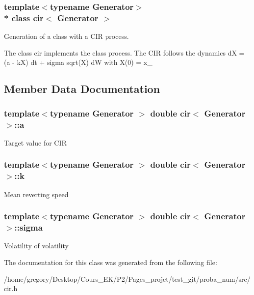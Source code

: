 \subsubsection*{template$<$typename Generator$>$\\*
class cir$<$ Generator $>$}

Generation of a class with a C\+IR process. 

The class cir implements the class process. The C\+IR follows the dynamics dX = (a -\/ kX) dt + sigma sqrt(\+X) dW with X(0) = x\+\_ 

\subsection{Member Data Documentation}
\subsubsection[{\texorpdfstring{a}{a}}]{\setlength{\rightskip}{0pt plus 5cm}template$<$typename Generator $>$ double {\bf cir}$<$ Generator $>$\+::a\hspace{0.3cm}{\ttfamily [protected]}}\hypertarget{classcir_a358578305ea60d31c00546233304651c}{}\label{classcir_a358578305ea60d31c00546233304651c}
Target value for C\+IR 
\subsubsection[{\texorpdfstring{k}{k}}]{\setlength{\rightskip}{0pt plus 5cm}template$<$typename Generator $>$ double {\bf cir}$<$ Generator $>$\+::k\hspace{0.3cm}{\ttfamily [protected]}}\hypertarget{classcir_aa5b05ff03ee8bb587ea94426a9ce704b}{}\label{classcir_aa5b05ff03ee8bb587ea94426a9ce704b}
Mean reverting speed 
\subsubsection[{\texorpdfstring{sigma}{sigma}}]{\setlength{\rightskip}{0pt plus 5cm}template$<$typename Generator $>$ double {\bf cir}$<$ Generator $>$\+::sigma\hspace{0.3cm}{\ttfamily [protected]}}\hypertarget{classcir_a76df757acc0179e1cdf766ed6627efc9}{}\label{classcir_a76df757acc0179e1cdf766ed6627efc9}
Volatility of volatility 

The documentation for this class was generated from the following file\+:\begin{DoxyCompactItemize}
\item 
/home/gregory/\+Desktop/\+Cours\+\_\+\+E\+K/\+P2/\+Pages\+\_\+projet/test\+\_\+git/proba\+\_\+num/src/cir.\+h\end{DoxyCompactItemize}
